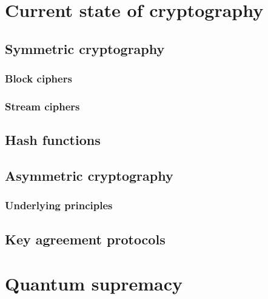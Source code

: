 \chapter{Current state of cryptography}
\label{ch:state_of_crypto}


\section{Symmetric cryptography}
\label{sec:symmetric_enc}


\subsection{Block ciphers}
\label{subsec:block_ciphers}


\subsection{Stream ciphers}
\label{subsec:stream_ciphers}


\section{Hash functions}
\label{sec:hash_functions}


\section{Asymmetric cryptography}
\label{sec:asymmetric_enc}


\subsection{Underlying principles}
\label{subsec:underlying_principles}


\section{Key agreement protocols}
\label{sec:key_agreement}


\chapter{Quantum supremacy}
\label{ch:quantum_supr}



